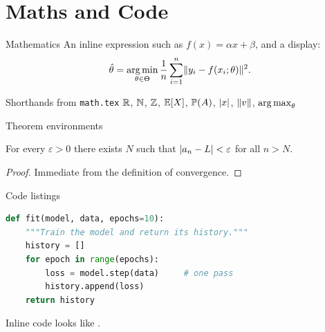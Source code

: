 \section{Maths and Code}

\begin{frame}{Mathematics}
  An inline expression such as $f(x) = \alpha x + \beta$, and a display:
  \begin{equation}
    \hat{\theta} = \operatorname*{arg\,min}_{\theta \in \Theta}
      \frac{1}{n}\sum_{i=1}^{n} \lVert y_i - f(x_i; \theta)\rVert^2 .
  \end{equation}

  \begin{block}{Shorthands from \texttt{math.tex}}
    $\mathbb{R}$, $\mathbb{N}$, $\mathbb{Z}$, $\mathbb{E}[X]$, $\mathbb{P}(A)$, $\lvert x\rvert$, $\lVert v\rVert$,
    $\operatorname*{arg\,max}_\theta$
  \end{block}
\end{frame}

\begin{frame}{Theorem environments}
  \begin{theorem}
    For every $\varepsilon > 0$ there exists $N$ such that
    $\lvert a_n - L\rvert < \varepsilon$ for all $n > N$.
  \end{theorem}

  \begin{proof}
    Immediate from the definition of convergence.
  \end{proof}
\end{frame}

\begin{frame}[fragile]{Code listings}
\begin{lstlisting}[language=Python]
def fit(model, data, epochs=10):
    """Train the model and return its history."""
    history = []
    for epoch in range(epochs):
        loss = model.step(data)     # one pass
        history.append(loss)
    return history
\end{lstlisting}

  Inline code looks like .
\end{frame}
